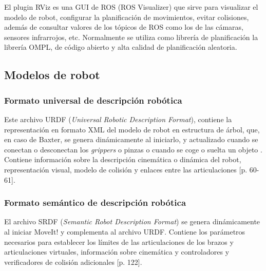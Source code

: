 \noindent El plugin RViz \cite{rviz} es una GUI de ROS (ROS Visualizer) que sirve para visualizar el modelo de robot, configurar la planificación de movimientos, evitar colisiones, además de consultar valores de los tópicos de ROS como los de las cámaras, sensores infrarrojos, etc. Normalmente se utiliza como librería de planificación la librería OMPL, de código abierto y alta calidad de planificación aleatoria. \\


\subsection{Modelos de robot}
\subsubsection{Formato universal de descripción robótica}
\noindent Este archivo URDF (\textit{Universal Robotic Description Format}), contiene la representación en formato XML del modelo de robot en estructura de árbol\cite{models2}, que, en caso de Baxter, se genera dinámicamente al iniciarlo, y actualizado cuando se conectan o desconectan los \textit{grippers} o pinzas o cuando se coge o suelta un objeto \cite{models}. Contiene información sobre la descripción cinemática o dinámica del robot, representación visual, modelo de colisión y enlaces entre las articulaciones \cite{models3} [p. 60-61]. \\


\subsubsection{Formato semántico de descripción robótica}

\noindent El archivo SRDF (\textit{Semantic Robot Description Format}) se genera dinámicamente al iniciar MoveIt! y complementa al archivo URDF. Contiene los parámetros necesarios para establecer los límites de las articulaciones de los brazos y articulaciones virtuales, información sobre cinemática y controladores y verificadores de colisión adicionales \cite{models3} [p. 122]. \\
